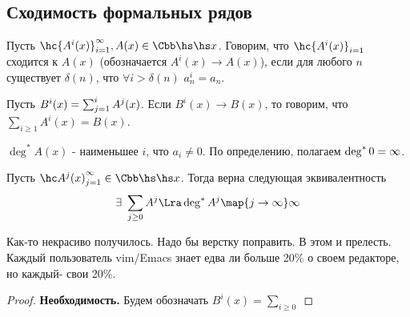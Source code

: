 \documentclass[unicode,10pt]{article}
\begin{document}
\subsection{Сходимость формальных рядов}
\begin{df}
  Пусть $\hc{A^i(x)}_{i=1}^\infty,A(x)\in\Csr$. Говорим, что $\hc{A^i(x)}_{i=1}$ сходится к $A(x)$
  (обозначается $A^i(x)\to A(x)$), если для любого $n$ существует $\delta(n)$, что $\forall i>\delta(n)$
  $a_n^i=a_n$.
\end{df}
\begin{denote}
  Пусть $B^i(x)=\sum_{j=1}^{i}A^j(x)$. Если $B^i(x)\to B(x)$, то
  говорим, что $\displaystyle\sum_{i\ge1}A^i(x)=B(x)$.
\end{denote}
\begin{denote}
  $\deg^*A(x)$ - наименьшее $i$,  что $a_i\neq 0$. По определению, полагаем $\deg^*0=\infty$.
\end{denote}
\begin{lemma}
  Пусть $\seq{A^j(x)}{1}\in\Csr$. Тогда верна следующая эквивалентность
  \begin{displaymath}
    \exists\ \sum_{j\ge0}A^j\Lra \dega A^j\map{j\to\infty}\infty
  \end{displaymath}
\end{lemma}
\begin{authornote}
Как-то некрасиво получилось. Надо бы верстку поправить. В этом и прелесть. Каждый пользователь
vim/Emacs знает едва ли больше 20\% о своем редакторе, но каждый- свои 20\%.
\end{authornote}
\begin{proof}
  {\bf Необходимость.}
  Будем обозначать $\displaystyle B^i(x)=\sum_{i\ge0}$

\end{proof}
\end{document}
